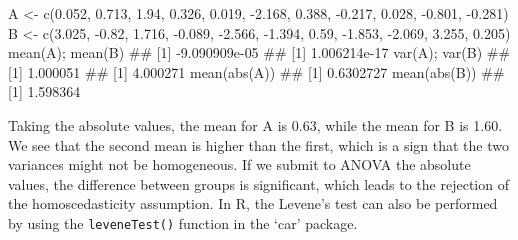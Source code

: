 \documentclass[a4paper,12pt,oneside]{book}
\newenvironment{Shaded}{\begin{snugshade}}{\end{snugshade}}
\newcommand{\FloatTok}[1]{#1}
\newcommand{\SpecialCharTok}[1]{#1}
\newcommand{\DocumentationTok}[1]{#1}
\newcommand{\OtherTok}[1]{#1}
\newcommand{\FunctionTok}[1]{#1}
\newcommand{\NormalTok}[1]{#1}
\begin{document}
\begin{Shaded}
\begin{Highlighting}[]
\NormalTok{A }\OtherTok{\textless{}{-}} \FunctionTok{c}\NormalTok{(}\FloatTok{0.052}\NormalTok{, }\FloatTok{0.713}\NormalTok{, }\FloatTok{1.94}\NormalTok{, }\FloatTok{0.326}\NormalTok{, }\FloatTok{0.019}\NormalTok{, }\SpecialCharTok{{-}}\FloatTok{2.168}\NormalTok{, }\FloatTok{0.388}\NormalTok{,}
       \SpecialCharTok{{-}}\FloatTok{0.217}\NormalTok{, }\FloatTok{0.028}\NormalTok{, }\SpecialCharTok{{-}}\FloatTok{0.801}\NormalTok{, }\SpecialCharTok{{-}}\FloatTok{0.281}\NormalTok{)}
\NormalTok{B }\OtherTok{\textless{}{-}} \FunctionTok{c}\NormalTok{(}\FloatTok{3.025}\NormalTok{, }\SpecialCharTok{{-}}\FloatTok{0.82}\NormalTok{, }\FloatTok{1.716}\NormalTok{, }\SpecialCharTok{{-}}\FloatTok{0.089}\NormalTok{, }\SpecialCharTok{{-}}\FloatTok{2.566}\NormalTok{, }\SpecialCharTok{{-}}\FloatTok{1.394}\NormalTok{,}
       \FloatTok{0.59}\NormalTok{, }\SpecialCharTok{{-}}\FloatTok{1.853}\NormalTok{, }\SpecialCharTok{{-}}\FloatTok{2.069}\NormalTok{, }\FloatTok{3.255}\NormalTok{, }\FloatTok{0.205}\NormalTok{)}
\FunctionTok{mean}\NormalTok{(A); }\FunctionTok{mean}\NormalTok{(B)}
\DocumentationTok{\#\# [1] {-}9.090909e{-}05}
\DocumentationTok{\#\# [1] 1.006214e{-}17}
\FunctionTok{var}\NormalTok{(A); }\FunctionTok{var}\NormalTok{(B)}
\DocumentationTok{\#\# [1] 1.000051}
\DocumentationTok{\#\# [1] 4.000271}
\FunctionTok{mean}\NormalTok{(}\FunctionTok{abs}\NormalTok{(A))}
\DocumentationTok{\#\# [1] 0.6302727}
\FunctionTok{mean}\NormalTok{(}\FunctionTok{abs}\NormalTok{(B))}
\DocumentationTok{\#\# [1] 1.598364}
\end{Highlighting}
\end{Shaded}

Taking the absolute values, the mean for A is 0.63, while the mean for B is 1.60. We see that the second mean is higher than the first, which is a sign that the two variances might not be homogeneous. If we submit to ANOVA the absolute values, the difference between groups is significant, which leads to the rejection of the homoscedasticity assumption. In R, the Levene's test can also be performed by using the \texttt{leveneTest()} function in the `car' package.
\end{document}

